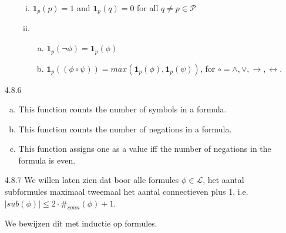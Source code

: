 \begin{enumerate}
\begin{enumerate}[(a)]
	\begin{enumerate}[(i)]
	
		\item $\mathbf{1}_{p}(p)=1$ and $\mathbf{1}_{p}(q)=0$ for all $q\neq p\in\mathcal{P}$
		
		\item \begin{enumerate}[(a)]
		
			\item $\mathbf{1}_{p}(\neg\phi)=\mathbf{1}_{p}(\phi)$
			
			\item $\mathbf{1}_{p}((\phi\circ\psi))=max(\mathbf{1}_{p}(\phi),\mathbf{1}_{p}(\psi))$, for $\circ=\land,\lor,\to,\leftrightarrow$.
		
		\end{enumerate}
		
		\end{enumerate}
	
	\end{enumerate}
	
	\item[4.8.6]
	
	\begin{enumerate}[(a)]
	
		\item This function counts the number of symbols in a formula.
		
		\item This function counts the number of negations in a formula.
		
		\item This function assigns one as a value iff the number of negations in the formula is even.
	
	\end{enumerate}
	
  \item[4.8.7] We willen laten zien dat boor alle formules $\phi\in\mathcal{L}$,
	het aantal subformules maximaal tweemaal het aantal connectieven plus 1,
	i.e. $|sub(\phi)| \leq 2 \cdot \#_{conn}(\phi) + 1$.

	  We bewijzen dit met inductie op formules.


\end{enumerate}
